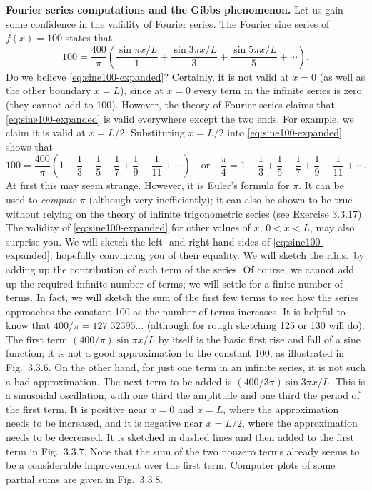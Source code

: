 \textbf{Fourier series computations and the Gibbs phenomenon.}  Let us gain some confidence in the validity of Fourier series.  The Fourier sine series of $f(x) = 100$ states that
\begin{equation}
\label{eq:sine100-expanded}
100 = \frac{400}{\pi} \left( \frac{\sin \pi x/L}{1} + \frac{\sin 3\pi x/L}{3} + \frac{\sin 5\pi x/L}{5} + \cdots \right).
\end{equation}
Do we believe \eqref{eq:sine100-expanded}?  Certainly, it is not valid at $x = 0$ (as well as the other boundary $x = L$), since at $x = 0$ every term in the infinite series is zero (they cannot add to 100).  However, the theory of Fourier series claims that \eqref{eq:sine100-expanded} is valid everywhere except the two ends.  For example, we claim it is valid at $x = L/2$.  Substituting $x = L/2$ into \eqref{eq:sine100-expanded} shows that
\[
100 = \frac{400}{\pi} \left(1 - \frac{1}{3} + \frac{1}{5} - \frac{1}{7} + \frac{1}{9} - \frac{1}{11} + \cdots \right) \quad \text{or} \quad \frac{\pi}{4} = 1 - \frac{1}{3} + \frac{1}{5} - \frac{1}{7} + \frac{1}{9} - \frac{1}{11} + \cdots.
\]
At first this may seem strange.  However, it is Euler's formula for $\pi$.  It can be used to \textit{compute} $\pi$ (although very inefficiently); it can also be shown to be true without relying on the theory of infinite trigonometric series (see Exercise 3.3.17).  The validity of \eqref{eq:sine100-expanded} for other values of $x$, $0 < x < L$, may also surprise you.  We will sketch the left- and right-hand sides of \eqref{eq:sine100-expanded}, hopefully convincing you of their equality.  We will sketch the r.h.s.\ by adding up the contribution of each term of the series.  Of course, we cannot add up the required infinite number of terms; we will settle for a finite number of terms.  In fact, we will sketch the sum of the first few terms to see how the series approaches the constant 100 as the number of terms increases.  It is helpful to know that $400/\pi = 127.32395\ldots$ (although for rough sketching 125 or 130 will do).  The first term $(400/\pi)\sin \pi x/L$ by itself is the basic first rise and fall of a sine function; it is not a good approximation to the constant 100, as illustrated in Fig.~3.3.6.  On the other hand, for just one term in an infinite series, it is not such a bad approximation.  The next term to be added is $(400/3\pi)\sin 3\pi x/L$.  This is a sinusoidal oscillation, with one third the amplitude and one third the period of the first term.  It is positive near $x = 0$ and $x = L$, where the approximation needs to be increased, and it is negative near $x = L/2$, where the approximation needs to be decreased.  It is sketched in dashed lines and then added to the first term in Fig.~3.3.7.  Note that the sum of the two nonzero terms already seems to be a considerable improvement over the first term.  Computer plots of some partial sums are given in Fig.~3.3.8.

